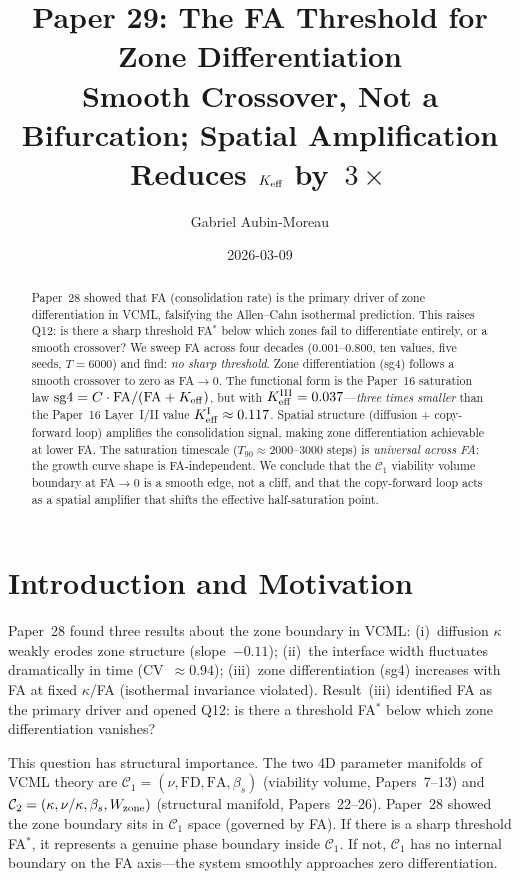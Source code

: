 \documentclass[11pt,a4paper]{article}
\title{\textbf{Paper 29: The FA Threshold for Zone Differentiation}\\[4pt]
\large Smooth Crossover, Not a Bifurcation;
       Spatial Amplification Reduces $K_{\rm eff}$ by~$3\times$}
\author{Gabriel Aubin-Moreau}
\date{2026-03-09}
\begin{document}
\maketitle

\begin{abstract}
Paper~28 showed that FA (consolidation rate) is the primary driver of zone
differentiation in VCML, falsifying the Allen--Cahn isothermal prediction.
This raises Q12: is there a sharp threshold FA$^*$ below which zones
fail to differentiate entirely, or a smooth crossover?
We sweep FA across four decades ($0.001$--$0.800$, ten values, five seeds,
$T=6000$) and find: \emph{no sharp threshold}.
Zone differentiation (sg4) follows a smooth crossover to zero as FA$\to0$.
The functional form is the Paper~16 saturation law
$\mathrm{sg4} = C\cdot\mathrm{FA}/(\mathrm{FA}+K_{\rm eff})$,
but with $K_{\rm eff}^{\rm III} = 0.037$---\emph{three times smaller}
than the Paper~16 Layer~I/II value $K_{\rm eff}^{\rm I} \approx 0.117$.
Spatial structure (diffusion + copy-forward loop) amplifies the consolidation
signal, making zone differentiation achievable at lower FA.
The saturation timescale ($T_{90}\approx2000$--$3000$ steps) is
\emph{universal across FA}: the growth curve shape is FA-independent.
We conclude that the $\mathcal{C}_1$ viability volume boundary at FA$\to0$
is a smooth edge, not a cliff, and that the copy-forward loop acts as a
spatial amplifier that shifts the effective half-saturation point.
\end{abstract}

\section{Introduction and Motivation}

Paper~28 found three results about the zone boundary in VCML:
(i)~diffusion $\kappa$ weakly erodes zone structure (slope~$-0.11$);
(ii)~the interface width fluctuates dramatically in time (CV~$\approx0.94$);
(iii)~zone differentiation (sg4) increases with FA at fixed $\kappa/$FA
(isothermal invariance violated).
Result~(iii) identified FA as the primary driver and opened Q12:
is there a threshold FA$^*$ below which zone differentiation vanishes?

This question has structural importance. The two 4D parameter manifolds of
VCML theory are $\mathcal{C}_1 = (\nu, \mathrm{FD}, \mathrm{FA}, \beta_s)$
(viability volume, Papers~7--13) and $\mathcal{C}_2 = (\kappa, \nu/\kappa,
\beta_s, W_{\rm zone})$ (structural manifold, Papers~22--26).
Paper~28 showed the zone boundary sits in $\mathcal{C}_1$ space (governed by FA).
If there is a sharp threshold FA$^*$, it represents a genuine phase boundary
inside $\mathcal{C}_1$.  If not, $\mathcal{C}_1$ has no internal boundary
on the FA axis---the system smoothly approaches zero differentiation.
\end{document}
